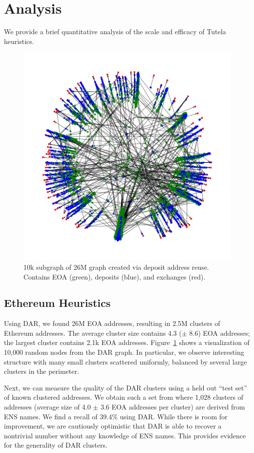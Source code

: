 \section{Analysis}
\label{sec:analysis}

We provide a brief quantitative analysis of the scale and efficacy of Tutela heuristics.
\begin{figure}[h!]
\includegraphics[width=\linewidth]{figures/dar_graph.png}
\caption{10k subgraph of 26M graph created via deposit address reuse. Contains EOA (green), deposits (blue), and exchanges (red).}
\label{fig:dargraph}
\end{figure}
\subsection{Ethereum Heuristics}

Using DAR, we found 26M EOA addresses, resulting in 2.5M clusters of Ethereum addresses. The average cluster size contains 4.3 ($\pm$ 8.6) EOA addresses; the largest cluster contains 2.1k EOA addresses. Figure~\ref{fig:dargraph} shows a visualization of 10,000 random nodes from the DAR graph. In particular, we observe interesting structure with many small clusters scattered uniformly, balanced by several large clusters in the perimeter.

Next, we can measure the quality of the DAR clusters using a held out ``test set'' of known clustered addresses. We obtain such a set from \cite{beres2021blockchain} where 1,028 clusters of addresses (average size of 4.0 $\pm$ 3.6 EOA addresses per cluster) are derived from ENS names. We find a recall of 39.4\% using DAR. While there is room for improvement, we are cautiously optimistic that DAR is able to recover a nontrivial number without any knowledge of ENS names. This provides evidence for the generality of DAR clusters.

